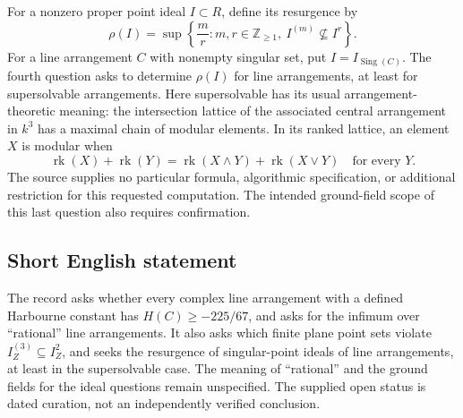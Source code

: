 \documentclass[11pt]{article}
\newcommand{\Z}{\mathbb{Z}}
\begin{document}
For a nonzero proper point ideal \(I\subset R\), define its resurgence by
\[
\rho(I)=\sup\left\{\frac{m}{r}:m,r\in\Z_{\ge1},\ I^{(m)}\not\subseteq I^r\right\}.
\]
For a line arrangement \(C\) with nonempty singular set, put \(I=I_{\operatorname{Sing}(C)}\). The fourth question asks to determine \(\rho(I)\) for line arrangements, at least for supersolvable arrangements. Here supersolvable has its usual arrangement-theoretic meaning: the intersection lattice of the associated central arrangement in \(k^3\) has a maximal chain of modular elements. In its ranked lattice, an element \(X\) is modular when
\[
\operatorname{rk}(X)+\operatorname{rk}(Y)
=\operatorname{rk}(X\wedge Y)+\operatorname{rk}(X\vee Y)
\quad\text{for every }Y.
\]
The source supplies no particular formula, algorithmic specification, or additional restriction for this requested computation. The intended ground-field scope of this last question also requires confirmation.
\subsection{Short English statement}
The record asks whether every complex line arrangement with a defined Harbourne constant has \(H(C)\ge-225/67\), and asks for the infimum over ``rational'' line arrangements. It also asks which finite plane point sets violate \(I_Z^{(3)}\subseteq I_Z^2\), and seeks the resurgence of singular-point ideals of line arrangements, at least in the supersolvable case. The meaning of ``rational'' and the ground fields for the ideal questions remain unspecified. The supplied open status is dated curation, not an independently verified conclusion.
\end{document}
